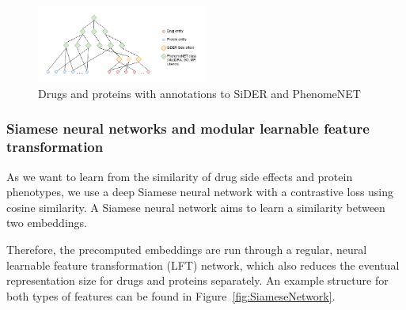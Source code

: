 \documentclass{bioinfo}
\begin{document}

\begin{figure}[!tpb]%
	\centerline{\includegraphics[width=0.5\textwidth]{figures/drug_protein_ontology_network.png}}
	\caption{Drugs and proteins with annotations to SiDER and PhenomeNET}
	\label{fig:Onto}
\end{figure}


\subsubsection{Siamese neural networks and modular learnable feature transformation}


As we want to learn from the similarity of drug side effects and
protein phenotypes, we use a deep Siamese neural network with
a contrastive loss using cosine similarity.
A Siamese neural network aims to learn a similarity between two
embeddings.


Therefore, the precomputed embeddings are run through a regular,
neural learnable feature transformation (LFT) network, which also
reduces the eventual representation size for drugs and proteins
separately. An example structure for both types of features can be
found in Figure~\ref{fig:SiameseNetwork}.
\end{document}
